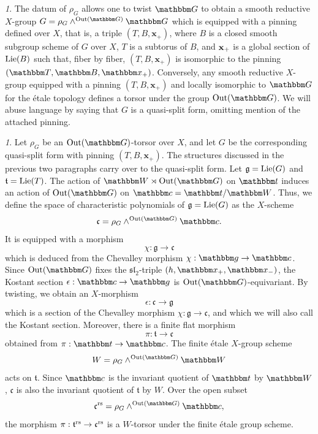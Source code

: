 \documentclass[12pt,english]{smfart}
\numberwithin{equation}{subsection}
\theoremstyle{remark}
\newtheorem{numero}[equation]{}
\newcommand\frakg{{\mathfrak g}}
\newcommand\frakt{{\mathfrak t}}
\newcommand\frakc{{\mathfrak c}}
\newcommand\bfx{{\mathbf x}}
\newcommand\GG{{\mathbbm G}}
\newcommand\bbB{{\mathbbm B}}
\newcommand\bbW{{\mathbbm W}}
\newcommand\bbT{{\mathbbm T}}
\newcommand\bbx{{\mathbbm x}}
\newcommand\bbg{{\mathbbm g}}
\newcommand\bbt{{\mathbbm t}}
\newcommand\bbc{{\mathbbm c}}
\newcommand\Lie{{\rm Lie}}
\newcommand\Out{{\rm Out}}
\newcommand\rs{{\rm rs}}
\begin{document}
\begin{numero}
The datum of $\rho_G$ allows one to twist $\GG$ to obtain a smooth reductive $X$-group $G=\rho_G\wedge^{\Out(\GG)} \GG$ which is equipped with a pinning defined over $X$, that is, a triple $(T,B,\bfx_+)$, where $B$ is a closed smooth subgroup scheme of $G$ over $X$, $T$ is a subtorus of $B$, and ${\bf x_+}$ is a global section of $\Lie(B)$ such that, fiber by fiber, $(T,B,\bfx_+)$ is isomorphic to the pinning $(\bbT,\bbB,\bbx_+)$. Conversely, any smooth reductive $X$-group equipped with a pinning $(T,B,\bfx_+)$ and locally isomorphic to $\GG$ for the \'{e}tale topology defines a torsor under the group $\Out(\GG)$. We will abuse language by saying that $G$ is a quasi-split form, omitting mention of the attached pinning.
\end{numero}

\begin{numero}
Let $\rho_G$ be an $\Out(\GG)$-torsor over $X$, and let $G$ be the corresponding quasi-split form with pinning $(T,B,\bfx_+)$. The structures discussed in the previous two paragraphs carry over to the quasi-split form. Let $\frakg=\Lie(G)$ and $\frakt=\Lie(T)$. The action of $\bbW\rtimes\Out(\GG)$ on $\bbt$ induces an action of $\Out(\GG)$ on $\bbc=\bbt/\bbW$. Thus, we define the space of characteristic polynomials of $\frakg=\Lie(G)$ as the $X$-scheme
$$\frakc=\rho_G\wedge^{\Out(\GG)} \bbc.$$
It is equipped with a morphism
$$\chi:\frakg\rightarrow \frakc$$
which is deduced from the Chevalley morphism $\chi:\bbg\rightarrow\bbc$. Since $\Out(\GG)$ fixes the $\mathfrak{sl}_2$-triple $(h,\bbx_+,\bbx_-)$, the Kostant section $\epsilon:\bbc\rightarrow \bbg$ is $\Out(\GG)$-equivariant. By twisting, we obtain an $X$-morphism
\begin{equation}\label{section de Kostant tordue}
\epsilon:\frakc\rightarrow \frakg
\end{equation}
which is a section of the Chevalley morphism $\chi:\frakg\rightarrow \frakc$, and which we will also call the Kostant section. Moreover, there is a finite flat morphism
$$\pi:\frakt\rightarrow \frakc$$
obtained from $\pi:\bbt\rightarrow\bbc$. The finite \'{e}tale $X$-group scheme
$$W=\rho_G \wedge^{\Out(\GG)}\bbW$$
acts on $\frakt$. Since $\bbc$ is the invariant quotient of $\bbt$ by $\bbW$, $\frakc$ is also the invariant quotient of $\frakt$ by $W$. Over the open subset
$$\frakc^\rs=\rho_G\wedge^{\Out(\GG)} \bbc,$$
the morphism $\pi:\frakt^\rs\rightarrow \frakc^\rs$ is a $W$-torsor under the finite \'{e}tale group scheme.
\end{numero}
\end{document}
